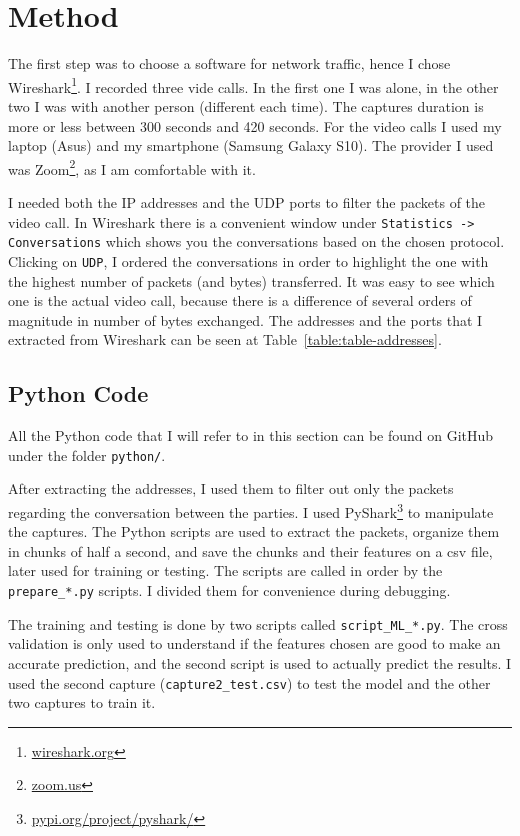 \section{Method}

The first step was to choose a software for network traffic, hence I chose Wireshark\footnote{\href{https://www.wireshark.org/}{wireshark.org}}. I recorded three vide calls. In the first one I was alone, in the other two I was with another person (different each time). The captures duration is more or less between 300 seconds and 420 seconds. For the video calls I used my laptop (Asus) and my smartphone (Samsung Galaxy S10). The provider I used was Zoom\footnote{\href{https://zoom.us/}{zoom.us}}, as I am comfortable with it.

I needed both the IP addresses and the UDP ports to filter the packets of the video call. In Wireshark there is a convenient window under \texttt{Statistics -> Conversations} which shows you the conversations based on the chosen protocol. Clicking on \texttt{UDP}, I ordered the conversations in order to highlight the one with the highest number of packets (and bytes) transferred. It was easy to see which one is the actual video call, because there is a difference of several orders of magnitude in number of bytes exchanged. The addresses and the ports that I extracted from Wireshark can be seen at Table~\ref{table:table-addresses}.


\subsection{Python Code}
All the Python code that I will refer to in this section can be found on GitHub under the folder \texttt{python/}.

After extracting the addresses, I used them to filter out only the packets regarding the conversation between the parties. I used PyShark\footnote{\href{https://pypi.org/project/pyshark/}{pypi.org/project/pyshark/}} to manipulate the captures. The Python scripts are used to extract the packets, organize them in chunks of half a second, and save the chunks and their features on a csv file, later used for training or testing. The scripts are called in order by the \texttt{prepare\_*.py} scripts. I divided them for convenience during debugging.

The training and testing is done by two scripts called \texttt{script\_ML\_*.py}. The cross validation is only used to understand if the features chosen are good to make an accurate prediction, and the second script is used to actually predict the results. I used the second capture (\texttt{capture2\_test.csv}) to test the model and the other two captures to train it.

